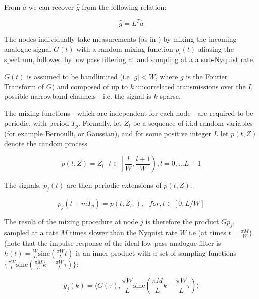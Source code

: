 From \(\hat{a}\) we can recover \(\hat{g}\) from the following relation:

\begin{equation}
\hat{g} = L^{T} \hat{a}
\end{equation}

The nodes individually take measurements (as in \cite{mishali2010theory}) by mixing the incoming analogue signal \(G\left(t\right)\) with a random mixing function \(p_i\left(t\right)\) aliasing the spectrum, followed by low pass filtering at and sampling at a a sub-Nyquist rate.

\(G\left(t\right)\) is assumed to be bandlimited (i.e \(|g| < W\), where \(g\) is the Fourier Transform of \(G\)) and composed of up to \(k\) uncorrelated transmissions over the \(L\) possible narrowband channels - i.e. the signal is \(k\)-sparse. 

The mixing functions - which are independent for each node - are required to be periodic, with period \(T_p\). Formally, let \(Z_l\) be a sequence of i.i.d random variables (for example Bernoulli, or Gaussian), and for some positive integer \(L\) let \(p\left(t, Z\right)\) denote the random process

\begin{equation}
p\left(t, Z\right) = Z_l \text{ } t \in \left[\frac{l}{W}, \frac{l+1}{W}\right), l = 0, \ldots L-1
\end{equation}

The signals, \(p_j\left(t\right)\) are then periodic extensions of \(p\left(t, Z\right)\):

\begin{equation}
p_j\left(t+mT_p\right) = p\left(t, Z_l,\right), \text{ } for, t\in \left[0, L/W\right]
\end{equation}

The result of the mixing procedure at node \(j\) is therefore the product \(Gp_j\), sampled at a rate \(M\) times slower than the Nyquist rate \(W\) i.e (at times \(t = \frac{\pi M}{W}\)) (note that the impulse response of the ideal low-pass analogue filter is \(h\left(t\right) = \frac{W}{L}\mathrm{sinc}\left(\frac{\pi W}{L}t\right)\) is an inner product with a set of sampling functions \(\{\frac{\pi W }{L}\mathrm{sinc}\left(\frac{\pi M}{L}k - \frac{\pi W}{L}\tau\right)\}\):

\begin{equation}
y_j\left(k\right) = \langle G\left(\tau\right), \frac{\pi W }{L}\mathrm{sinc}\left(\frac{\pi M}{L}k - \frac{\pi W}{L}\tau\right) \rangle
\end{equation}

